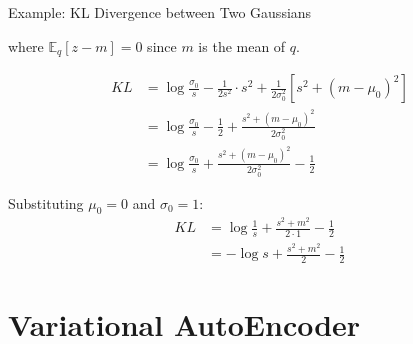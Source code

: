 \documentclass[aspectratio=169,xcolor=dvipsnames,svgnames,x11names,fleqn]{beamer}
\begin{document}
\begin{frame}[allowframebreaks]{Example: KL Divergence between Two Gaussians}
\begin{tcolorbox}[colframe=theoryBlue, breakable]
where $\mathbb{E}_q[z - m] = 0$ since $m$ is the mean of $q$.
 
  \end{tcolorbox}

\pause


\begin{tcolorbox}[colframe=theoryBlue, breakable]

 \begin{align*}
    KL
    &= \log\frac{\sigma_0}{s}
       - \frac{1}{2s^2} \cdot s^2
       + \frac{1}{2\sigma_0^2}\left[s^2 + (m - \mu_0)^2\right] \\[6pt]
    &= \log\frac{\sigma_0}{s}
       - \frac{1}{2}
       + \frac{s^2 + (m - \mu_0)^2}{2\sigma_0^2} \\[10pt]
    & = \log\frac{\sigma_0}{s}
            + \frac{s^2 + (m - \mu_0)^2}{2\sigma_0^2}
            - \frac{1}{2}
\end{align*}
 
  \end{tcolorbox}

\pause


\begin{tcolorbox}[colframe=theoryBlue, breakable]

 Substituting $\mu_0 = 0$ and $\sigma_0 = 1$:
\begin{align*}
    KL
    &= \log\frac{1}{s} + \frac{s^2 + m^2}{2 \cdot 1} - \frac{1}{2} \\[6pt]
    &= -\log s + \frac{s^2 + m^2}{2} - \frac{1}{2}
\end{align*}
 

\end{tcolorbox}



\end{frame}


\section{Variational AutoEncoder}

\begin{frame}
    \sectionpage
\end{frame}
\end{document}
